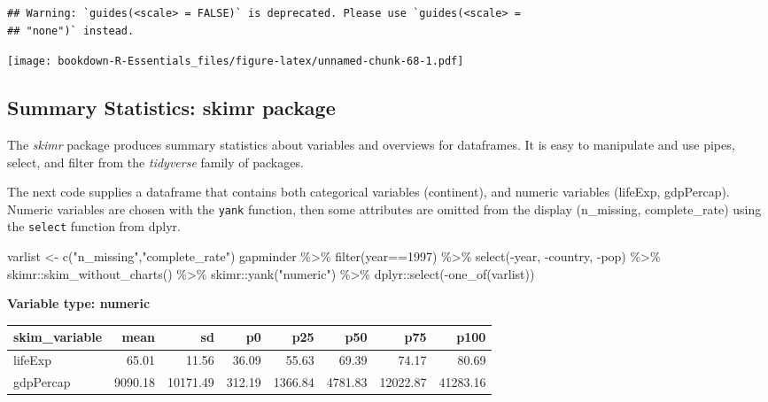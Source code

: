 \documentclass[
]{book}
\newenvironment{Shaded}{\begin{snugshade}}{\end{snugshade}}
\newcommand{\DecValTok}[1]{\textcolor[rgb]{0.00,0.00,0.81}{#1}}
\newcommand{\FunctionTok}[1]{\textcolor[rgb]{0.00,0.00,0.00}{#1}}
\newcommand{\NormalTok}[1]{#1}
\newcommand{\OtherTok}[1]{\textcolor[rgb]{0.56,0.35,0.01}{#1}}
\newcommand{\SpecialCharTok}[1]{\textcolor[rgb]{0.00,0.00,0.00}{#1}}
\newcommand{\StringTok}[1]{\textcolor[rgb]{0.31,0.60,0.02}{#1}}
\begin{document}
\begin{verbatim}
## Warning: `guides(<scale> = FALSE)` is deprecated. Please use `guides(<scale> =
## "none")` instead.
\end{verbatim}

\texttt{[image: bookdown-R-Essentials\_files/figure-latex/unnamed-chunk-68-1.pdf]}

\hypertarget{summary-statistics-skimr-package}{%
\subsection{Summary Statistics: skimr package}\label{summary-statistics-skimr-package}}

The \emph{skimr} package produces summary statistics about variables and overviews for dataframes. It is easy to manipulate and use pipes, select, and filter from the \emph{tidyverse} family of packages.

The next code supplies a dataframe that contains both categorical variables (continent), and numeric variables (lifeExp, gdpPercap). Numeric variables are chosen with the \texttt{yank} function, then some attributes are omitted from the display (n\_missing, complete\_rate) using the \texttt{select} function from dplyr.

\begin{Shaded}
\begin{Highlighting}[]
\NormalTok{varlist }\OtherTok{\textless{}{-}} \FunctionTok{c}\NormalTok{(}\StringTok{"n\_missing"}\NormalTok{,}\StringTok{"complete\_rate"}\NormalTok{)}
\NormalTok{gapminder }\SpecialCharTok{\%\textgreater{}\%} \FunctionTok{filter}\NormalTok{(year}\SpecialCharTok{==}\DecValTok{1997}\NormalTok{) }\SpecialCharTok{\%\textgreater{}\%} 
  \FunctionTok{select}\NormalTok{(}\SpecialCharTok{{-}}\NormalTok{year, }\SpecialCharTok{{-}}\NormalTok{country, }\SpecialCharTok{{-}}\NormalTok{pop) }\SpecialCharTok{\%\textgreater{}\%} 
\NormalTok{  skimr}\SpecialCharTok{::}\FunctionTok{skim\_without\_charts}\NormalTok{() }\SpecialCharTok{\%\textgreater{}\%}
\NormalTok{  skimr}\SpecialCharTok{::}\FunctionTok{yank}\NormalTok{(}\StringTok{"numeric"}\NormalTok{) }\SpecialCharTok{\%\textgreater{}\%}
\NormalTok{  dplyr}\SpecialCharTok{::}\FunctionTok{select}\NormalTok{(}\SpecialCharTok{{-}}\FunctionTok{one\_of}\NormalTok{(varlist))}
\end{Highlighting}
\end{Shaded}

\textbf{Variable type: numeric}

\begin{tabular}{l|r|r|r|r|r|r|r}
\hline
skim\_variable & mean & sd & p0 & p25 & p50 & p75 & p100\\
\hline
lifeExp & 65.01 & 11.56 & 36.09 & 55.63 & 69.39 & 74.17 & 80.69\\
\hline
gdpPercap & 9090.18 & 10171.49 & 312.19 & 1366.84 & 4781.83 & 12022.87 & 41283.16\\
\hline
\end{tabular}
\end{document}

